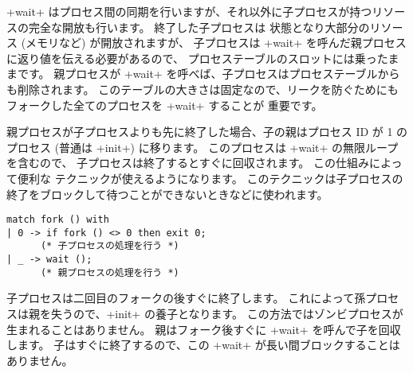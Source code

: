 \ml+wait+ はプロセス間の同期を行いますが、それ以外に子プロセスが持つリソースの完全な開放も行います。
終了した子プロセスは  状態となり大部分のリソース (メモリなど) が開放されますが、
子プロセスは \ml+wait+ を呼んだ親プロセスに返り値を伝える必要があるので、
プロセステーブルのスロットには乗ったままです。
親プロセスが \ml+wait+ を呼べば、子プロセスはプロセステーブルからも削除されます。
このテーブルの大きさは固定なので、リークを防ぐためにもフォークした全てのプロセスを \ml+wait+ することが
重要です。

\label{double-fork}
親プロセスが子プロセスよりも先に終了した場合、子の親はプロセス ID が 1 のプロセス
(普通は \ml+init+) に移ります。
このプロセスは \ml+wait+ の無限ループを含むので、
子プロセスは終了するとすぐに回収されます。
この仕組みによって便利な  テクニックが使えるようになります。
このテクニックは子プロセスの終了をブロックして待つことができないときなどに使われます。
%
\begin{lstlisting}
match fork () with
| 0 -> if fork () <> 0 then exit 0;
      (* 子プロセスの処理を行う *)
| _ -> wait ();
      (* 親プロセスの処理を行う *)
\end{lstlisting}
%
子プロセスは二回目のフォークの後すぐに終了します。
これによって孫プロセスは親を失うので、\ml+init+ の養子となります。
この方法ではゾンビプロセスが生まれることはありません。
親はフォーク後すぐに \ml+wait+ を呼んで子を回収します。
子はすぐに終了するので、この \ml+wait+ が長い間ブロックすることはありません。


